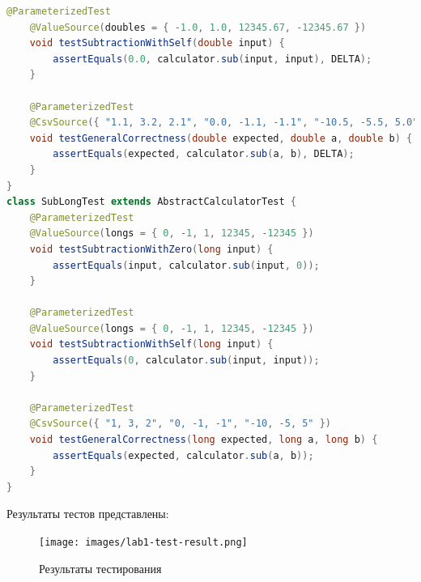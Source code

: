 \documentclass[a4paper]{article}
\begin{document}
\begin{lstlisting}[language=Java]
    @ParameterizedTest
    @ValueSource(doubles = { -1.0, 1.0, 12345.67, -12345.67 })
    void testSubtractionWithSelf(double input) {
        assertEquals(0.0, calculator.sub(input, input), DELTA);
    }

    @ParameterizedTest
    @CsvSource({ "1.1, 3.2, 2.1", "0.0, -1.1, -1.1", "-10.5, -5.5, 5.0" })
    void testGeneralCorrectness(double expected, double a, double b) {
        assertEquals(expected, calculator.sub(a, b), DELTA);
    }
}
class SubLongTest extends AbstractCalculatorTest {
    @ParameterizedTest
    @ValueSource(longs = { 0, -1, 1, 12345, -12345 })
    void testSubtractionWithZero(long input) {
        assertEquals(input, calculator.sub(input, 0));
    }

    @ParameterizedTest
    @ValueSource(longs = { 0, -1, 1, 12345, -12345 })
    void testSubtractionWithSelf(long input) {
        assertEquals(0, calculator.sub(input, input));
    }

    @ParameterizedTest
    @CsvSource({ "1, 3, 2", "0, -1, -1", "-10, -5, 5" })
    void testGeneralCorrectness(long expected, long a, long b) {
        assertEquals(expected, calculator.sub(a, b));
    }
}\end{lstlisting}
    Результаты тестов представлены:
    \begin{figure}[H]
        \centering
        \begin{minipage}[t]{0.5\textwidth}
            \texttt{[image: images/lab1-test-result.png]}
        \end{minipage}
        \caption{Результаты тестирования}
    \end{figure}
\end{document}
